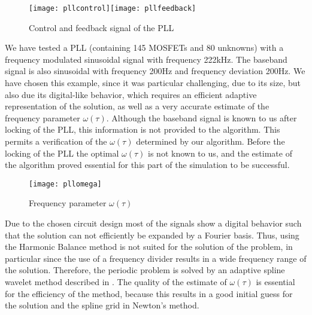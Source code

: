 \documentclass{siamltex}
\begin{document}
\begin{figure}[h]
  \centering
  \texttt{[image: pllcontrol]}\hfill\texttt{[image: pllfeedback]}
  \caption{Control and feedback signal of the PLL}
  \label{pllcontrol}
\end{figure}

We have tested a PLL (containing 145 MOSFETs and 80 unknowns)
with a frequency modulated sinusoidal signal with frequency 222kHz.
The baseband signal is also sinusoidal with frequency 200Hz and frequency deviation 200Hz.
{{{We have chosen this example, since it was particular challenging, due to its size, but also
due its digital-like behavior, which requires an efficient adaptive representation of the solution, as well as
a very accurate estimate of the frequency parameter $\omega(\tau)$. Although the baseband signal is 
known to us after locking of the PLL, this information is not provided to the algorithm.
This permits a verification of the  $\omega(\tau)$ determined by our algorithm. Before the locking
of the PLL the optimal $\omega(\tau)$ is not known to us, and the estimate of the algorithm
proved essential for this part of the simulation to be successful.}}}

\begin{figure}[h]
  \centering
  \texttt{[image: pllomega]}
  \caption{Frequency parameter $\omega(\tau)$}
  \label{pllomega}
\end{figure}

Due to the chosen circuit design most of the signals show a digital behavior such that the solution
can not efficiently be expanded by a Fourier basis. Thus, using the Harmonic Balance method is not suited
for the solution of the problem, in particular since the use of a frequency divider results in a wide 
frequency range of the solution.
Therefore, the periodic problem is solved by an adaptive 
spline wavelet method described in \cite{BiDau10a,BiDau10b}. The quality of the estimate of
$\omega(\tau)$ is essential for the efficiency of the method, because this results in a good initial guess
for the solution and the spline grid in Newton's method.  
\end{document}
